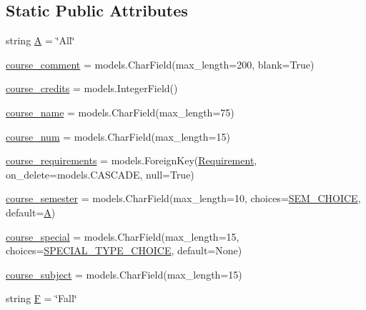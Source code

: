 \subsection*{Static Public Attributes}
\begin{DoxyCompactItemize}
\item 
string \mbox{\hyperlink{classlanding_1_1models_1_1Course_a9a6614f90db0d81754b98a123c43ecef}{A}} = \char`\"{}All\char`\"{}
\item 
\mbox{\hyperlink{classlanding_1_1models_1_1Course_abe19a335ae5a8e6e19bde096ef69b70d}{course\+\_\+comment}} = models.\+Char\+Field(max\+\_\+length=200, blank=True)
\item 
\mbox{\hyperlink{classlanding_1_1models_1_1Course_a2d5c8952932526241c8168ff624780fa}{course\+\_\+credits}} = models.\+Integer\+Field()
\item 
\mbox{\hyperlink{classlanding_1_1models_1_1Course_a6c3b552faf247213e88da70d3eab8551}{course\+\_\+name}} = models.\+Char\+Field(max\+\_\+length=75)
\item 
\mbox{\hyperlink{classlanding_1_1models_1_1Course_aa0134d6ca4ef236142fb0ac7670732a7}{course\+\_\+num}} = models.\+Char\+Field(max\+\_\+length=15)
\item 
\mbox{\hyperlink{classlanding_1_1models_1_1Course_a8d2a4c6f59aefe907d9d9cbd84a5ac5b}{course\+\_\+requirements}} = models.\+Foreign\+Key(\mbox{\hyperlink{classlanding_1_1models_1_1Requirement}{Requirement}}, on\+\_\+delete=models.\+C\+A\+S\+C\+A\+DE, null=True)
\item 
\mbox{\hyperlink{classlanding_1_1models_1_1Course_a1c139fd87a247369225dbe0388f72cce}{course\+\_\+semester}} = models.\+Char\+Field(max\+\_\+length=10, choices=\mbox{\hyperlink{classlanding_1_1models_1_1Course_af5c611e98c1a5fc7ee9c7f072af17631}{S\+E\+M\+\_\+\+C\+H\+O\+I\+CE}}, default=\mbox{\hyperlink{classlanding_1_1models_1_1Course_a9a6614f90db0d81754b98a123c43ecef}{A}})
\item 
\mbox{\hyperlink{classlanding_1_1models_1_1Course_a996761ee6b60fb089233e4f0878e96e4}{course\+\_\+special}} = models.\+Char\+Field(max\+\_\+length=15, choices=\mbox{\hyperlink{classlanding_1_1models_1_1Course_ac0a930e2ca556697d478cb97a894568b}{S\+P\+E\+C\+I\+A\+L\+\_\+\+T\+Y\+P\+E\+\_\+\+C\+H\+O\+I\+CE}}, default=None)
\item 
\mbox{\hyperlink{classlanding_1_1models_1_1Course_af4e65f18a31f13b3d33a5497b6d70a43}{course\+\_\+subject}} = models.\+Char\+Field(max\+\_\+length=15)
\item 
string \mbox{\hyperlink{classlanding_1_1models_1_1Course_aa11bad52172a59a7fa37ab291117abfd}{F}} = \char`\"{}Fall\char`\"{}

\end{DoxyCompactItemize}
